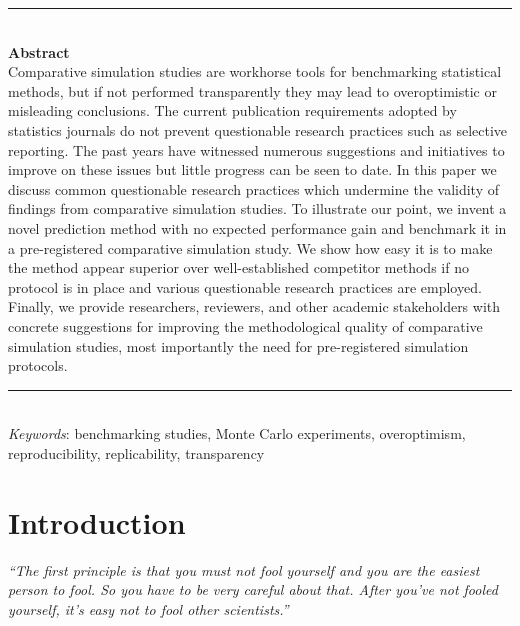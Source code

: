 \documentclass[a4paper, 11pt]{article}
\title{
  \vspace{-2em}
  \textbf{\longtitle} \\
  \subtitle
}
\author{
  \textbf{\longauthors} \\
  \affiliation \\
  \small\{samuel.pawel, lucasheinrich.kook, kelly.reeve\}@uzh.ch
}
\date{} %
\begin{document}
\maketitle

\begin{center}
\begin{minipage}{13cm}
{\small
\rule{\textwidth}{0.5pt} \\
{\centering \textbf{Abstract} \\
Comparative simulation studies are workhorse tools for benchmarking statistical methods,
but if not performed transparently they may lead to 
overoptimistic or misleading conclusions. The current publication requirements adopted by 
statistics journals do not prevent questionable research practices such as selective 
reporting. The past years have witnessed 
numerous suggestions and initiatives to improve on these issues but little progress can be seen to date. In this 
paper we discuss common questionable research practices which undermine the validity 
of findings from comparative simulation studies. To illustrate our point, we invent 
a novel prediction method with no expected performance gain and benchmark it in a pre-registered
comparative simulation study. We show how easy it is to make the method 
appear superior over well-established competitor methods if no protocol is in place 
and various questionable research practices are employed. Finally, we provide researchers,
reviewers, and other academic stakeholders with concrete suggestions for improving the 
methodological quality of comparative simulation studies, most importantly the
need for pre-registered simulation protocols.
}
\rule{\textwidth}{0.4pt} \\
\textit{Keywords}: 
benchmarking studies, Monte Carlo experiments, overoptimism, 
reproducibility, replicability, transparency
}
\end{minipage}
\end{center}

\section{Introduction}

\begin{center}
\begin{minipage}{12cm}
\emph{``The first principle is that you must not fool yourself and you are
the easiest person to fool. So you have to be very careful about that.
After you've not fooled yourself, it's easy not to fool other scientists.''}
\end{minipage}
\end{center}
\begin{flushright}
\citet[p.~12]{Feynman1974}
\end{flushright}
\end{document}
